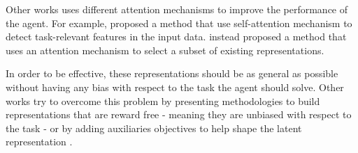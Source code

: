 Other works uses different attention mechanisms to improve the performance of the agent.
For example, \citet{bramlage2022generalized} proposed a method that use self-attention mechanism to detect task-relevant features in the input data.
\citet{blakeman2022selective} instead proposed a method that uses an attention mechanism to select a subset of existing representations.

In order to be effective, these representations should be as general as possible without having any bias with respect to the task the agent should solve.
Other works try to overcome this problem by presenting methodologies to build representations that are reward free - meaning they are unbiased with respect to the task \citep{stooke2021decoupling} - or by adding auxiliaries objectives to help shape the latent representation \citep{lan2023bootstrapped}.
















